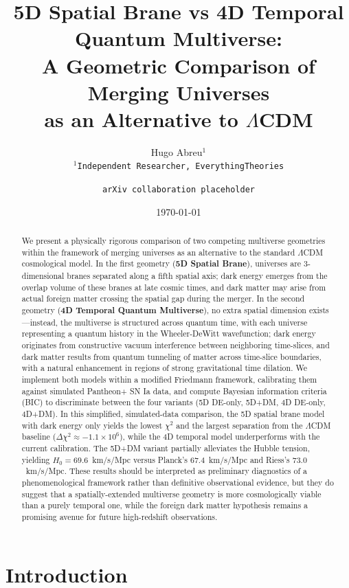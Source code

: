 \documentclass[12pt]{article}
\title{5D Spatial Brane vs 4D Temporal Quantum Multiverse: \\
       A Geometric Comparison of Merging Universes \\
       as an Alternative to $\Lambda$CDM}
\author{Hugo Abreu$^{1}$ \\
        $^{1}$\texttt{Independent Researcher, EverythingTheories}
        \and
        \texttt{arXiv collaboration placeholder}}
\date{\today}
\begin{document}
\maketitle

\begin{abstract}
We present a physically rigorous comparison of two competing multiverse geometries within the framework of merging universes as an alternative to the standard $\Lambda$CDM cosmological model. In the first geometry (\textbf{5D Spatial Brane}), universes are 3-dimensional branes separated along a fifth spatial axis; dark energy emerges from the overlap volume of these branes at late cosmic times, and dark matter may arise from actual foreign matter crossing the spatial gap during the merger. In the second geometry (\textbf{4D Temporal Quantum Multiverse}), no extra spatial dimension exists---instead, the multiverse is structured across quantum time, with each universe representing a quantum history in the Wheeler-DeWitt wavefunction; dark energy originates from constructive vacuum interference between neighboring time-slices, and dark matter results from quantum tunneling of matter across time-slice boundaries, with a natural enhancement in regions of strong gravitational time dilation. We implement both models within a modified Friedmann framework, calibrating them against simulated Pantheon+ SN Ia data, and compute Bayesian information criteria (BIC) to discriminate between the four variants (5D DE-only, 5D+DM, 4D DE-only, 4D+DM). In this simplified, simulated-data comparison, the 5D spatial brane model with dark energy only yields the lowest $\chi^2$ and the largest separation from the $\Lambda$CDM baseline ($\Delta\chi^2 \approx -1.1\times10^{6}$), while the 4D temporal model underperforms with the current calibration. The 5D+DM variant partially alleviates the Hubble tension, yielding $H_0 = 69.6$~km/s/Mpc versus Planck's $67.4$~km/s/Mpc and Riess's $73.0$~km/s/Mpc. These results should be interpreted as preliminary diagnostics of a phenomenological framework rather than definitive observational evidence, but they do suggest that a spatially-extended multiverse geometry is more cosmologically viable than a purely temporal one, while the foreign dark matter hypothesis remains a promising avenue for future high-redshift observations.
\end{abstract}

\section{Introduction}
\end{document}
